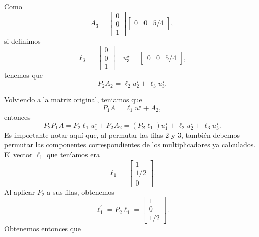 Como
\[A_3 = \begin{bmatrix}
    0 \\ 0 \\ 1
\end{bmatrix}\begin{bmatrix}
    0 & 0 & 5/4
\end{bmatrix},\]
si definimos
\[\ell_3 = \begin{bmatrix}
    0 \\ 0 \\ 1
\end{bmatrix}\quad u_3^\star = \begin{bmatrix}
    0 & 0 & 5/4
\end{bmatrix},\]
tenemos que
\[P_2A_2 = \ell_2 u_2^\star + \ell_3 u_3^\star.\]

Volviendo a la matriz original, teniamos que 
\[P_1 A = \ell_1 u_1^\star + A_2,\]
entonces
\[P_2P_1 A = P_2 \ell_1 u_1^\star + P_2 A_2 =  (P_2 \ell_1) u_1^\star + \ell_2 u_2^\star + \ell_3 u_3^\star .\]
Es importante notar aquí que, al permutar las filas $2$ y $3$, también debemos permutar las componentes correspondientes de los multiplicadores ya calculados. El vector $\ell_1$ que teníamos era
\[
\ell_1 = \begin{bmatrix} 1 \\ 1/2 \\ 0 \end{bmatrix}.
\]
Al aplicar $P_2$ a sus filas, obtenemos
\[
\ell_1^{\prime} = P_2 \ell_1 =
\begin{bmatrix} 1 \\ 0 \\ 1/2 \end{bmatrix}.
\]
Obtenemos entonces que 
